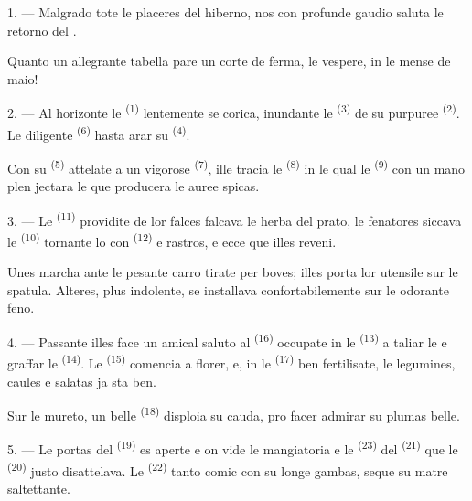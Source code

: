 \VUsaut{3.0mm}
\VUsaut{3.0mm}

\VUsaut{4.0mm}

1. --- Malgrado tote le placeres del hiberno, nos con profunde gaudio saluta le
retorno del .

Quanto un allegrante tabella pare un corte de ferma, le vespere, in le mense de
maio!

2. --- Al horizonte le  \textsuperscript{(1)} lentemente se corica,
inundante le  \textsuperscript{(3)} de su purpuree
 \textsuperscript{(2)}. Le diligente 
\textsuperscript{(6)} hasta arar su  \textsuperscript{(4)}.

Con su  \textsuperscript{(5)} attelate a un vigorose
 \textsuperscript{(7)}, ille tracia le 
\textsuperscript{(8)} in le qual le  \textsuperscript{(9)} con
un mano plen jectara le  que producera le auree spicas.

3. --- Le  \textsuperscript{(11)} providite de lor falces
falcava le herba del prato, le fenatores siccava le 
\textsuperscript{(10)} tornante lo con  \textsuperscript{(12)} e
rastros, e ecce que illes reveni.

Unes marcha ante le pesante carro tirate per boves; illes porta lor utensile sur
le spatula. Alteres, plus indolente, se installava confortabilemente sur le
odorante feno.

4. --- Passante illes face un amical saluto al 
\textsuperscript{(16)} occupate in le  \textsuperscript{(13)} a
taliar le  e graffar le 
\textsuperscript{(14)}. Le  \textsuperscript{(15)} comencia a
florer, e, in le  \textsuperscript{(17)} ben
fertilisate, le legumines, caules e salatas ja sta ben.

Sur le mureto, un belle  \textsuperscript{(18)} disploia su cauda,
pro facer admirar su plumas belle.

\VUsaut{3.0mm}

5. --- Le portas del  \textsuperscript{(19)} es aperte e on vide
le mangiatoria e le  \textsuperscript{(23)} del
 \textsuperscript{(21)} que le 
\textsuperscript{(20)} justo disattelava. Le 
\textsuperscript{(22)} tanto comic con su longe gambas, seque su matre
saltettante.


